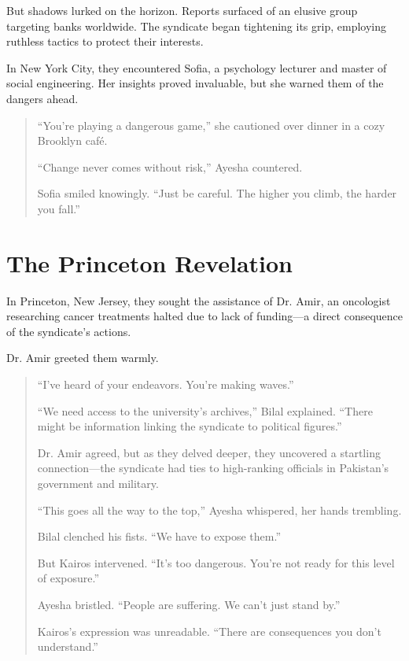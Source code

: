 \documentclass[12pt]{book}
\begin{document}
But shadows lurked on the horizon. Reports surfaced of an elusive group targeting banks worldwide. The syndicate began tightening its grip, employing ruthless tactics to protect their interests.

In New York City, they encountered Sofia, a psychology lecturer and master of social engineering. Her insights proved invaluable, but she warned them of the dangers ahead.

\begin{quote}
    ``You're playing a dangerous game,'' she cautioned over dinner in a cozy Brooklyn café.

    ``Change never comes without risk,'' Ayesha countered.

    Sofia smiled knowingly. ``Just be careful. The higher you climb, the harder you fall.''
\end{quote}

\chapter{The Princeton Revelation}

In Princeton, New Jersey, they sought the assistance of Dr. Amir, an oncologist researching cancer treatments halted due to lack of funding—a direct consequence of the syndicate's actions.

Dr. Amir greeted them warmly.

\begin{quote}
    ``I've heard of your endeavors. You're making waves.''

    ``We need access to the university's archives,'' Bilal explained. ``There might be information linking the syndicate to political figures.''

    Dr. Amir agreed, but as they delved deeper, they uncovered a startling connection—the syndicate had ties to high-ranking officials in Pakistan's government and military.

    ``This goes all the way to the top,'' Ayesha whispered, her hands trembling.

    Bilal clenched his fists. ``We have to expose them.''

    But Kairos intervened. ``It's too dangerous. You're not ready for this level of exposure.''

    Ayesha bristled. ``People are suffering. We can't just stand by.''

    Kairos's expression was unreadable. ``There are consequences you don't understand.''
\end{quote}
\end{document}
